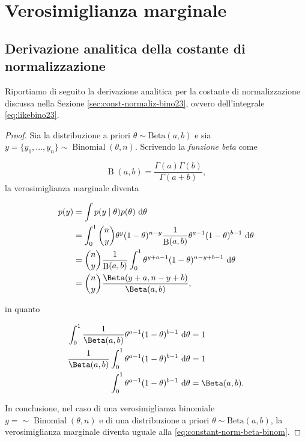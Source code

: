 \documentclass[
  11pt,
]{krantz}
\DeclareMathOperator{\Bin}{Binomial} %
\DeclareMathOperator{\B}{B} %
\theoremstyle{definition}
\theoremstyle{definition}
\theoremstyle{definition}
\theoremstyle{definition}
\theoremstyle{remark}
\begin{document}
\hypertarget{appendix:const-norm-bino23}{%
\chapter{Verosimiglianza marginale}\label{appendix:const-norm-bino23}}

\hypertarget{derivazione-analitica-della-costante-di-normalizzazione}{%
\section{Derivazione analitica della costante di normalizzazione}\label{derivazione-analitica-della-costante-di-normalizzazione}}

Riportiamo di seguito la derivazione analitica per la costante di normalizzazione discussa nella Sezione \ref{sec:const-normaliz-bino23}, ovvero dell'integrale \eqref{eq:likebino23}.

\begin{proof}
Sia la distribuzione a priori \(\theta \sim \mbox{Beta}(a, b)\) e sia \(y = \{y_1, \dots, y_n\} \sim \Bin(\theta, n)\). Scrivendo la \emph{funzione beta} come

\[
\B(a, b) = \frac{\Gamma(a)\Gamma(b)}{\Gamma(a+b)},
\] la verosimiglianza marginale diventa

\begin{align}
p(y) &= \int p(y \mid \theta) p(\theta) \,\operatorname {d}\!\theta \notag\\
&= \int_0^1 \binom{n}{y}\theta^{y} (1 - \theta)^{n- y} \frac{1}{\B(a,b)} \theta^{a-1} (1-\theta)^{b-1} \,\operatorname {d}\!\theta \notag\\
&= \binom{n}{y}\frac{1}{\B(a,b)} \int_0^1 \theta^{y + a - 1} (1-\theta)^{n- y + b-1}  \,\operatorname {d}\!\theta \notag\\
&= \binom{n}{y}\frac{\Beta(y + a, n- y + b)}{\Beta(a,b)},
\label{eq:constant-norm-beta-binom}
\end{align}

in quanto

\begin{align}
\int_0^1 \frac{1}{\Beta(a,b)} \theta^{a-1} (1-\theta)^{b-1} \,\operatorname {d}\! \theta &= 1\notag\\
\frac{1}{\Beta(a,b)} \int_0^1  \theta^{a-1} (1-\theta)^{b-1} \,\operatorname {d}\! \theta &= 1\notag\\
\int_0^1  \theta^{a-1} (1-\theta)^{b-1} \,\operatorname {d}\!\theta &= \Beta(a,b). \notag
\end{align}

In conclusione, nel caso di una verosimiglianza binomiale \(y = \sim \Bin(\theta, n)\) e di una distribuzione a priori \(\theta \sim \mbox{Beta}(a, b)\), la verosimiglianza marginale diventa uguale alla \eqref{eq:constant-norm-beta-binom}.
\end{proof}
\end{document}
